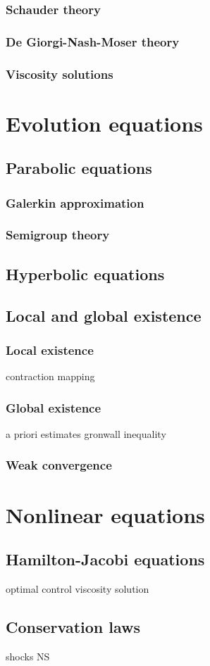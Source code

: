 \documentclass{../../large}
\begin{document}
\section{Schauder theory}
\section{De Giorgi-Nash-Moser theory}
\section{Viscosity solutions}








\part{Evolution equations}

\chapter{Parabolic equations}
\section{Galerkin approximation}
\section{Semigroup theory}

\chapter{Hyperbolic equations}

\chapter{Local and global existence}
\section{Local existence}
contraction mapping
\section{Global existence}
a priori estimates
gronwall inequality
\section{Weak convergence}



\part{Nonlinear equations}

\chapter{}

\chapter{Hamilton-Jacobi equations}
optimal control
viscosity solution

\chapter{Conservation laws}
shocks
NS

\
\end{document}
